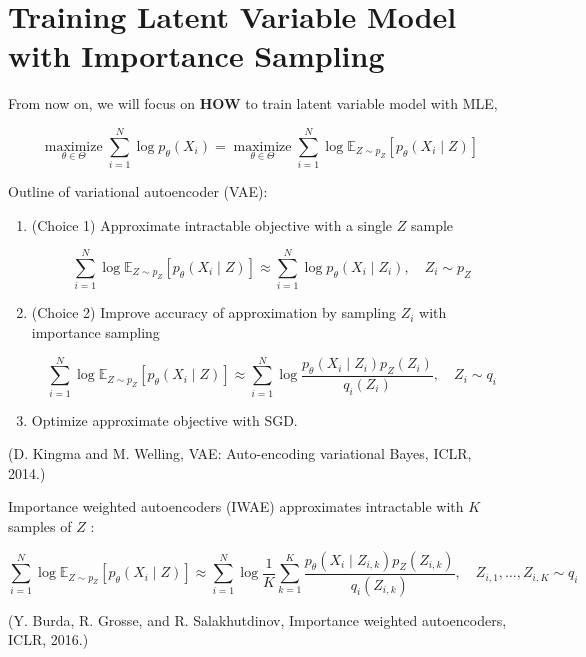 \documentclass{report}
\begin{document}
\section{Training Latent Variable Model with Importance Sampling}

From now on, we will focus on \textbf{HOW} to train latent variable model with MLE,

$$
\underset{\theta \in \Theta}{\operatorname{maximize}} \sum_{i=1}^{N} \log p_{\theta}\left(X_{i}\right)=\underset{\theta \in \Theta}{\operatorname{maximize}} \sum_{i=1}^{N} \log \mathbb{E}_{Z \sim p_{Z}}\left[p_{\theta}\left(X_{i} \mid Z\right)\right]
$$

\begin{concept}
    Outline of variational autoencoder (VAE):

    \begin{enumerate}
        \item
        (Choice 1) Approximate intractable objective with a single $Z$ sample

        $$
        \sum_{i=1}^{N} \log \mathbb{E}_{Z \sim p_{Z}}\left[p_{\theta}\left(X_{i} \mid Z\right)\right] \approx \sum_{i=1}^{N} \log p_{\theta}\left(X_{i} \mid Z_{i}\right), \quad Z_{i} \sim p_{Z}
        $$
        \item
        (Choice 2) Improve accuracy of approximation by sampling $Z_{i}$ with importance sampling

        $$
        \sum_{i=1}^{N} \log \mathbb{E}_{Z \sim p_{Z}}\left[p_{\theta}\left(X_{i} \mid Z\right)\right] \approx \sum_{i=1}^{N} \log \frac{p_{\theta}\left(X_{i} \mid Z_{i}\right) p_{Z}\left(Z_{i}\right)}{q_{i}\left(Z_{i}\right)}, \quad Z_{i} \sim q_{i}
        $$
        \item Optimize approximate objective with SGD.
    \end{enumerate}

    (D. Kingma and M. Welling, VAE: Auto-encoding variational Bayes, ICLR, 2014.)
\end{concept}

\begin{concept}
    Importance weighted autoencoders (IWAE) approximates intractable with $K$ samples of $Z$ :

    $$
    \sum_{i=1}^{N} \log \mathbb{E}_{Z \sim p_{Z}}\left[p_{\theta}\left(X_{i} \mid Z\right)\right] \approx \sum_{i=1}^{N} \log \frac{1}{K} \sum_{k=1}^{K} \frac{p_{\theta}\left(X_{i} \mid Z_{i, k}\right) p_{Z}\left(Z_{i, k}\right)}{q_{i}\left(Z_{i, k}\right)}, \quad Z_{i, 1}, \ldots, Z_{i, K} \sim q_{i}
    $$

    (Y. Burda, R. Grosse, and R. Salakhutdinov, Importance weighted autoencoders, ICLR, 2016.)
\end{concept}
\end{document}
